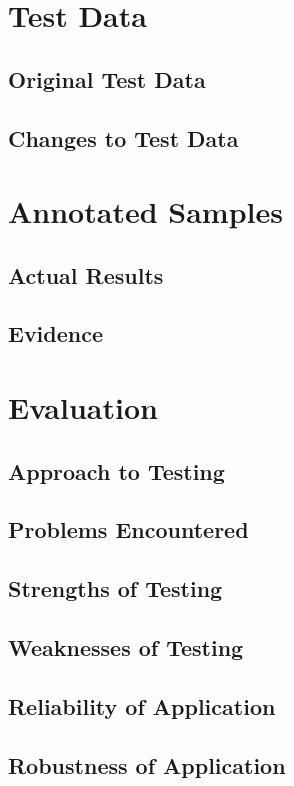 \begin{landscape}
\section{Test Data}

\subsection{Original Test Data}

\subsection{Changes to Test Data}

\section{Annotated Samples}

\subsection{Actual Results}

\subsection{Evidence}

\end{landscape}

\section{Evaluation}

\subsection{Approach to Testing}

\subsection{Problems Encountered}

\subsection{Strengths of Testing}

\subsection{Weaknesses of Testing}

\subsection{Reliability of Application}

\subsection{Robustness of Application}